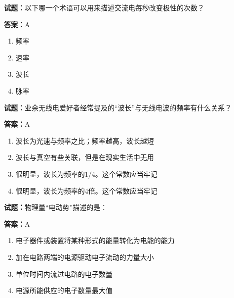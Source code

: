 \documentclass{ctexbook}
\begin{document}
\textbf{试题：}以下哪一个术语可以用来描述交流电每秒改变极性的次数？ 

\textbf{答案：}A 

\begin{enumerate}[leftmargin=3em]
  \item 频率 

  \item 速率 

  \item 波长 

  \item 脉率 

\end{enumerate}





\vspace{1em}

\textbf{试题：}业余无线电爱好者经常提及的“波长”与无线电波的频率有什么关系？ 

\textbf{答案：}A 

\begin{enumerate}[leftmargin=3em]
  \item 波长为光速与频率之比；频率越高，波长越短 

  \item 波长与真空有些关联，但是在现实生活中无用 

  \item 很明显，波长为频率的1/4。这个常数应当牢记 

  \item 很明显，波长为频率的4倍。这个常数应当牢记 

\end{enumerate}





\vspace{1em}

\textbf{试题：}物理量“电动势”描述的是： 

\textbf{答案：}A 

\begin{enumerate}[leftmargin=3em]
  \item 电子器件或装置将某种形式的能量转化为电能的能力 

  \item 加在电路两端的电源驱动电子流动的力量大小 

  \item 单位时间内流过电路的电子数量 

  \item 电源所能供应的电子数量最大值 

\end{enumerate}
\end{document}
